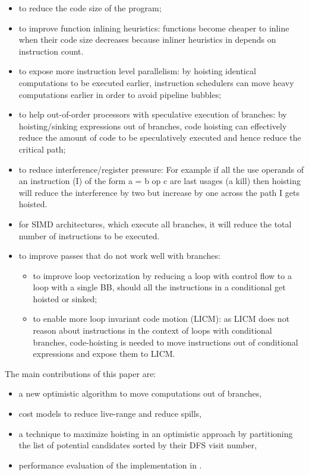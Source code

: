 \documentclass{sig-alternate}
\begin{document}
\begin{itemize}
\item to reduce the code size of the program;
\item to improve function inlining heuristics: functions become cheaper to
  inline when their code size decreases because inliner heuristics in \LLVM{}
  depends on instruction count.
\item to expose more instruction level parallelism: by hoisting identical
  computations to be executed earlier, instruction schedulers can move heavy
  computations earlier in order to avoid pipeline bubbles;
\item to help out-of-order processors with speculative execution of branches: by
  hoisting/sinking expressions out of branches, code hoisting can effectively
  reduce the amount of code to be speculatively executed and hence reduce the
  critical path;
\item to reduce interference/register pressure: For example if all the use
  operands of an instruction (I) of the form a = b op c are last usages (a kill)
  then hoisting will reduce the interference by two but increase by one across
  the path I gets hoisted.
\item for SIMD architectures, which execute all branches, it will reduce the
  total number of instructions to be executed.
\item to improve passes that do not work well with branches:
  \begin{itemize}
  \item to improve loop vectorization by reducing a loop with control flow to a
    loop with a single BB, should all the instructions in a conditional get
    hoisted or sinked;
  \item to enable more loop invariant code motion (LICM): as LICM does not
    reason about instructions in the context of loops with conditional branches,
    code-hoisting is needed to move instructions out of conditional expressions
    and expose them to LICM.
  \end{itemize}
\end{itemize}

The main contributions of this paper are:
\begin{itemize}
\item a new optimistic algorithm to move computations out of branches,
\item cost models to reduce live-range and reduce spills,
\item a technique to maximize hoisting in an optimistic approach by partitioning
  the list of potential candidates sorted by their DFS visit number,
\item performance evaluation of the implementation in \LLVM{}.
\end{itemize}
\end{document}
